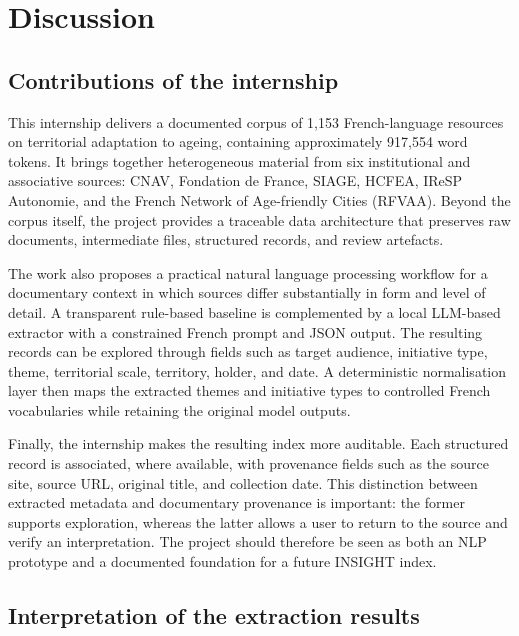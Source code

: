 
\chapter{Discussion}

\section{Contributions of the internship}

This internship delivers a documented corpus of 1,153 French-language
resources on territorial adaptation to ageing, containing approximately
917,554 word tokens. It brings together heterogeneous material from six
institutional and associative sources: CNAV, Fondation de France, SIAGE,
HCFEA, IReSP Autonomie, and the French Network of Age-friendly Cities
(RFVAA). Beyond the corpus itself, the project provides a traceable data
architecture that preserves raw documents, intermediate files, structured
records, and review artefacts.

The work also proposes a practical natural language processing workflow for a
documentary context in which sources differ substantially in form and level of
detail. A transparent rule-based baseline is complemented by a local LLM-based
extractor with a constrained French prompt and JSON output. The resulting
records can be explored through fields such as target audience, initiative
type, theme, territorial scale, territory, holder, and date. A deterministic
normalisation layer then maps the extracted themes and initiative types to
controlled French vocabularies while retaining the original model outputs.

Finally, the internship makes the resulting index more auditable. Each
structured record is associated, where available, with provenance fields such
as the source site, source URL, original title, and collection date. This
distinction between extracted metadata and documentary provenance is important:
the former supports exploration, whereas the latter allows a user to return to
the source and verify an interpretation. The project should therefore be seen
as both an NLP prototype and a documented foundation for a future INSIGHT
index.

\section{Interpretation of the extraction results}

